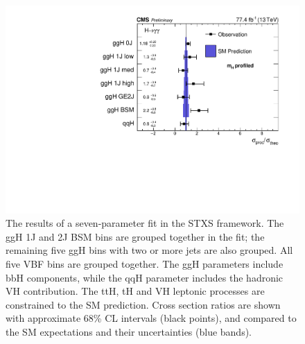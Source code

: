\begin{figure}[hptb]
\centering
\includegraphics[width=\textwidth]{Figures/Results/Stage1.pdf}
\caption{
  The results of a seven-parameter fit in the STXS framework. 
  The ggH 1J and 2J BSM bins are grouped together in the fit; 
  the remaining five ggH bins with two or more jets are also grouped. 
  All five VBF bins are grouped together. 
  The ggH parameters include bbH components, 
  while the qqH parameter includes the hadronic VH contribution. 
  The ttH, tH and VH leptonic processes are constrained to the SM prediction. 
  Cross section ratios are shown with approximate 68\% CL intervals (black points), 
  and compared to the SM expectations and their uncertainties (blue bands).
}
\label{fig:results_Stage1}
\end{figure}

